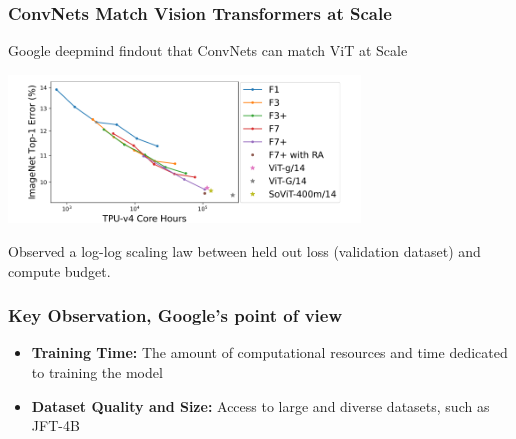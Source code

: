 \begin{frame}
\frametitle{ConvNets Match Vision Transformers at Scale}
Google deepmind findout that ConvNets can match ViT at Scale

\vspace{0.5 cm}

\begin{center}
    \includegraphics[width=0.7\textwidth]{img/3-section/log-log.png} 
\end{center}

Observed a log-log scaling law between held out loss (validation dataset) and compute budget.
\end{frame}

\begin{frame}
\frametitle{Key Observation, Google's point of view}

\vspace{0.5cm}
\begin{itemize}
    \item \textbf{Training Time:} The amount of computational resources and time dedicated to training the model
    \item \textbf{Dataset Quality and Size:} Access to large and diverse datasets, such as JFT-4B
\end{itemize}

\end{frame}


